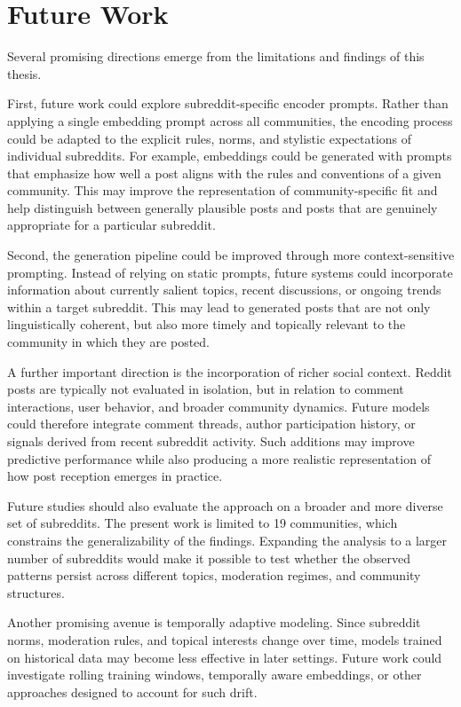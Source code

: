 \chapter{Future Work}
\label{chap:future_work}

Several promising directions emerge from the limitations and findings of this thesis.

First, future work could explore subreddit-specific encoder prompts. Rather than applying a single embedding prompt across all communities, the encoding process could be adapted to the explicit rules, norms, and stylistic expectations of individual subreddits. For example, embeddings could be generated with prompts that emphasize how well a post aligns with the rules and conventions of a given community. This may improve the representation of community-specific fit and help distinguish between generally plausible posts and posts that are genuinely appropriate for a particular subreddit.

Second, the generation pipeline could be improved through more context-sensitive prompting. Instead of relying on static prompts, future systems could incorporate information about currently salient topics, recent discussions, or ongoing trends within a target subreddit. This may lead to generated posts that are not only linguistically coherent, but also more timely and topically relevant to the community in which they are posted.

A further important direction is the incorporation of richer social context. Reddit posts are typically not evaluated in isolation, but in relation to comment interactions, user behavior, and broader community dynamics. Future models could therefore integrate comment threads, author participation history, or signals derived from recent subreddit activity. Such additions may improve predictive performance while also producing a more realistic representation of how post reception emerges in practice.

Future studies should also evaluate the approach on a broader and more diverse set of subreddits. The present work is limited to 19 communities, which constrains the generalizability of the findings. Expanding the analysis to a larger number of subreddits would make it possible to test whether the observed patterns persist across different topics, moderation regimes, and community structures.

Another promising avenue is temporally adaptive modeling. Since subreddit norms, moderation rules, and topical interests change over time, models trained on historical data may become less effective in later settings. Future work could investigate rolling training windows, temporally aware embeddings, or other approaches designed to account for such drift.

